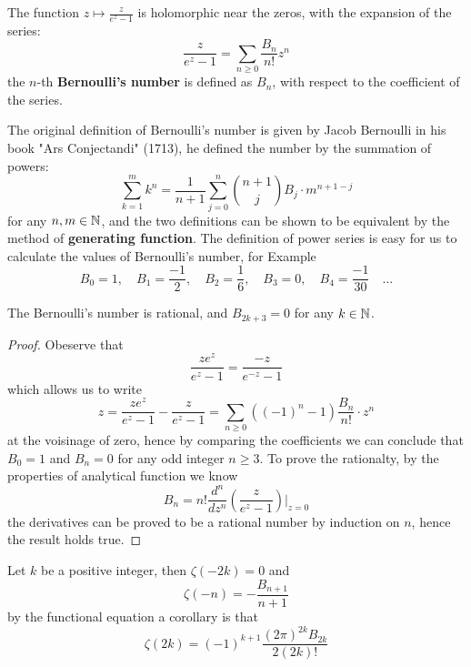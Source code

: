 \begin{colordefinition}
    The function $z \mapsto \frac{z}{e^z-1}$ is holomorphic near the zeros, with the expansion of the series:
    \[\frac{z}{e^z-1}  = \sum_{n \geq 0 } \frac{B_n}{n!}z^n\]
    the \(n\)-th \textbf{Bernoulli's number} is defined  as $B_n$, with respect to the coefficient of the series. 
\end{colordefinition}

The original definition of Bernoulli's number is given by Jacob Bernoulli in his book "Ars Conjectandi" (1713), he defined the number by the summation of powers:
\[\sum_{k=1}^m k^n = \frac{1}{n+1} \sum_{j=0}^n \binom{n+1}{j} B_j \cdot m^{n+1-j}\]
for any $n,m \in \mathbb{N}$, and the two definitions can be shown to be equivalent by the method of \textbf{generating function}. The definition of power series is easy for us to calculate the values of Bernoulli's number, for Example
\[B_0 = 1, \quad B_1 = \frac{-1}{2}, \quad B_2 = \frac{1}{6}, \quad B_3 = 0, \quad B_4 = \frac{-1}{30} \quad \dots\]
\begin{lemma}
    The Bernoulli's number is rational, and \(B_{2k+3} = 0\) for any \(k \in \mathbb{N}\).
\end{lemma}
\begin{proof}
    Obeserve that 
    \[\frac{ze^z}{e^z - 1} = \frac{-z}{e^{-z}-1} \]
    which allows us to write
    \[z = \frac{ze^z}{e^z-1}-\frac{z}{e^z-1} = \sum_{n\geq 0} ((-1)^n-1)\frac{B_n}{n!} \cdot z^n \]
    at the voisinage of zero, hence by comparing the coefficients we can conclude that \(B_0 = 1\) and \(B_n = 0\) for any odd integer \(n \geq 3\). To prove the rationalty, by the properties of analytical function we know
    \[B_n = n! \frac{d^n}{dz^n} \left(\frac{z}{e^z-1}\right) \bigg|_{z=0}\]
    the derivatives can be proved to be a rational number by induction on \(n\), hence the result holds true. 
\end{proof}

\begin{colorproposition}
    Let \(k\) be a positive integer, then \(\zeta(-2k) = 0\) and
    \[\zeta(-n) = - \frac{B_{n+1}}{n+1} \]
    by the functional equation a corollary is that
    \[\zeta(2k) = (-1)^{k+1} \frac{(2\pi)^{2k}B_{2k}}{2(2k)!}  \]
\end{colorproposition}

